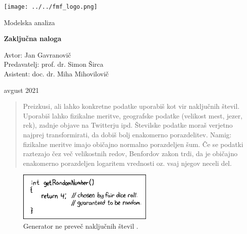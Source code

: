 \documentclass[11pt, oneside]{article}
\theoremstyle{definition}
\begin{document}

\begin{titlepage}
    \begin{center}
        \vspace*{0.8cm}

        \texttt{[image: ../../fmf\_logo.png]}
        \vspace{2cm}

        \large
        Modelska analiza

        \vspace{0.2cm}

        \Large
        \textbf{Zaključna naloga}

        \vspace{1cm}

        \normalsize
        Avtor: Jan Gavranovič \\
        \vspace{0.5cm}
        Predavatelj: prof. dr. Simon Širca \\
        Asistent: doc. dr. Miha Mihovilovič

        \vspace{0.5cm}

        avgust 2021

        \vspace{5cm}

        \begin{abstract}
            \noindent
            Preizkusi, ali lahko konkretne podatke uporabiš kot vir naključnih števil. Uporabiš lahko
            fizikalne meritve, geografske podatke (velikost mest, jezer, rek), zadnje objave na Twitterju ipd.
            Številske podatke moraš verjetno najprej transformirati, da dobiš bolj enakomerno porazdelitev.
            Namig: fizikalne  meritve  imajo  običajno  normalno  porazdeljen šum. Če se podatki raztezajo čez
            več velikostnih redov, Benfordov zakon trdi, da je običajno enakomerno porazdeljen logaritem vrednosti
            oz. vsaj njegov neceli del.
        \end{abstract}

    \end{center}
\end{titlepage}


\tableofcontents

\vspace*{3cm}

\begin{figure}[h!]
    \centering
    \includegraphics[width=0.6\textwidth]{random_number_xkcd.png}
    \caption{Generator ne preveč naključnih števil \cite{xkcd}.}
    \label{fig: 0}
\end{figure}
\end{document}
